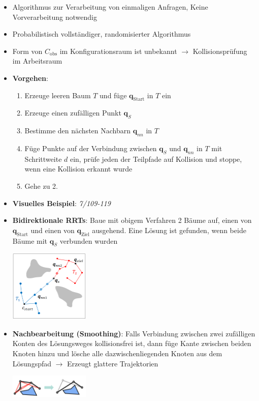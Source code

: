 \begin{itemize}
	\item Algorithmus zur Verarbeitung von einmaligen Anfragen, Keine Vorverarbeitung notwendig
	\item Probabilistisch vollständiger, randomisierter Algorithmus
	\item Form von $C_\text{obs}$ im Konfigurationsraum ist unbekannt $\rightarrow$ Kollisionsprüfung im Arbeitsraum
	\pagebreak
	
	\item \textbf{Vorgehen}:
	\begin{enumerate}
		\item Erzeuge leeren Baum $T$ und füge $\mathbf{q}_\text{Start}$ in $T$ ein
		\item Erzeuge einen zufälligen Punkt $\mathbf{q}_S$
		\item Bestimme den nächsten Nachbarn $\mathbf{q}_{nn}$ in $T$
		\item Füge Punkte auf der Verbindung zwischen $\mathbf{q}_S$ und $\mathbf{q}_{nn}$ in $T$ mit Schrittweite $d$ ein, prüfe jeden der Teilpfade auf Kollision und stoppe, wenn eine Kollision erkannt wurde
		\item Gehe zu 2.
	\end{enumerate}
	\item \textbf{Visuelles Beispiel}: \textit{7/109-119}
	\item \textbf{Bidirektionale RRTs}: Baue mit obigem Verfahren 2 Bäume auf, einen von $\mathbf{q}_\text{Start}$ und einen von $\mathbf{q}_\text{Ziel}$ ausgehend. Eine Lösung ist gefunden, wenn beide Bäume mit $\mathbf{q}_S$ verbunden wurden
	\begin{center}
		\includegraphics[width=0.3\textwidth]{images/bidirektional-rrt.png}
	\end{center}
	\item \textbf{Nachbearbeitung (Smoothing)}: Falls Verbindung zwischen zwei zufälligen Konten des Lösungsweges kollisionsfrei ist, dann füge Kante zwischen beiden Knoten hinzu und lösche alle dazwischenliegenden Knoten aus dem Lösungspfad $\rightarrow$ Erzeugt glattere Trajektorien
	\begin{center}
		\includegraphics[width=0.3\textwidth]{images/smoothing.png}
	\end{center}
\end{itemize}
